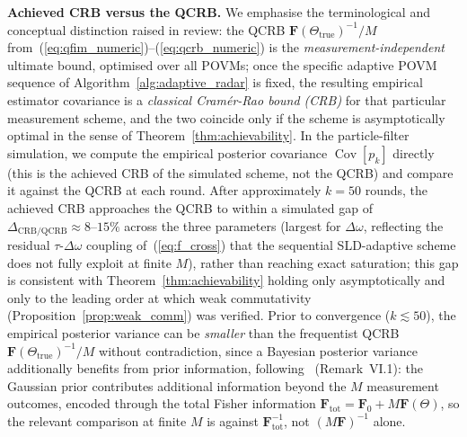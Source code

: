 \documentclass[journal]{IEEEtran}
\DeclareMathOperator{\Cov}{Cov}
\begin{document}
\textbf{Achieved CRB versus the QCRB.} We emphasise the terminological and conceptual distinction raised in review: the QCRB $\mathbf F(\Theta_{\text{true}})^{-1}/M$ from~(\ref{eq:qfim_numeric})--(\ref{eq:qcrb_numeric}) is the \emph{measurement-independent} ultimate bound, optimised over all POVMs; once the specific adaptive POVM sequence of Algorithm~\ref{alg:adaptive_radar} is fixed, the resulting empirical estimator covariance is a \emph{classical Cramér-Rao bound (CRB)} for that particular measurement scheme, and the two coincide only if the scheme is asymptotically optimal in the sense of Theorem~\ref{thm:achievability}. In the particle-filter simulation, we compute the empirical posterior covariance $\Cov[p_k]$ directly (this is the achieved CRB of the simulated scheme, not the QCRB) and compare it against the QCRB at each round. After approximately $k=50$ rounds, the achieved CRB approaches the QCRB to within a simulated gap of $\Delta_{\text{CRB/QCRB}} \approx 8\text{--}15\%$ across the three parameters (largest for $\Delta\omega$, reflecting the residual $\tau$-$\Delta\omega$ coupling of~(\ref{eq:f_cross}) that the sequential SLD-adaptive scheme does not fully exploit at finite $M$), rather than reaching exact saturation; this gap is consistent with Theorem~\ref{thm:achievability} holding only asymptotically and only to the leading order at which weak commutativity (Proposition~\ref{prop:weak_comm}) was verified. Prior to convergence ($k\lesssim50$), the empirical posterior variance can be \emph{smaller} than the frequentist QCRB $\mathbf F(\Theta_{\text{true}})^{-1}/M$ without contradiction, since a Bayesian posterior variance additionally benefits from prior information, following~\cite{gautum2024rigorous} (Remark~VI.1): the Gaussian prior contributes additional information beyond the $M$ measurement outcomes, encoded through the total Fisher information $\mathbf{F}_{\text{tot}} = \mathbf{F}_0 + M\mathbf{F}(\Theta)$, so the relevant comparison at finite $M$ is against $\mathbf F_{\text{tot}}^{-1}$, not $(M\mathbf F)^{-1}$ alone.
\end{document}
